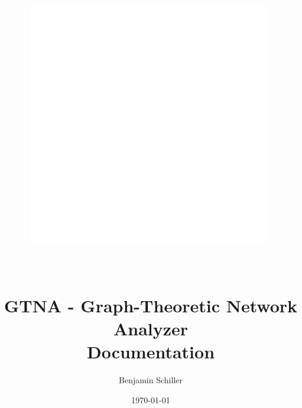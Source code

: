 \documentclass[10pt,a4paper]{article}
\title{\includegraphics[width=0.8\textwidth]{GTNA_Logo_RGB}$\;$\\ $\;$\\ $\;$\\ GTNA - Graph-Theoretic Network Analyzer \\ Documentation}
\author{Benjamin Schiller}
\date{\today}
\begin{document}
\maketitle

\pagebreak
\tableofcontents





















\appendix





%
%
%

%
\end{document}
